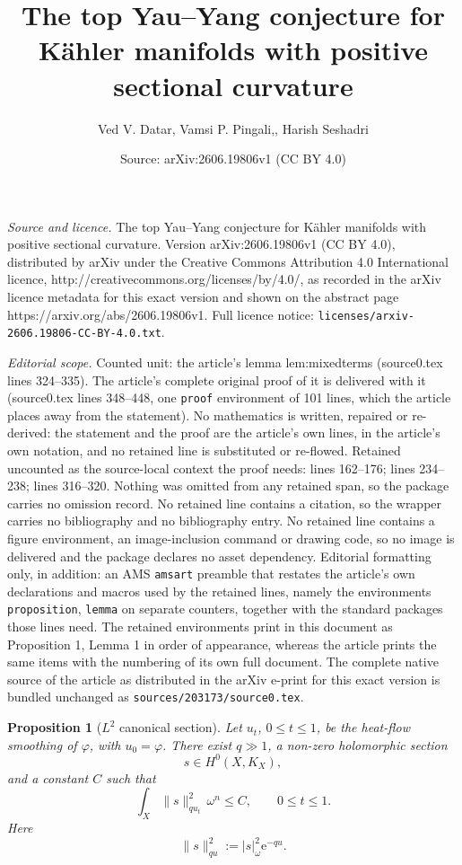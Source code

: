\documentclass[10pt,a4paper]{amsart}
\title{The top Yau--Yang conjecture for K\"ahler manifolds with positive sectional curvature}
\author{Ved V. Datar, Vamsi P. Pingali,, Harish Seshadri}
\date{Source: arXiv:2606.19806v1 (CC BY 4.0)}
\newtheorem{proposition}{Proposition}
\newcommand{\e}{\mathrm e}
\begin{document}
\maketitle

\noindent\emph{Source and licence.} The top Yau--Yang conjecture for K\"ahler manifolds with positive sectional curvature. Version arXiv:2606.19806v1 (CC BY 4.0), distributed by arXiv under the Creative Commons Attribution 4.0 International licence, http://creativecommons.org/licenses/by/4.0/, as recorded in the arXiv licence metadata for this exact version and shown on the abstract page https://arxiv.org/abs/2606.19806v1. Full licence notice: \texttt{licenses/arxiv-2606.19806-CC-BY-4.0.txt}.\par\smallskip

\noindent\textit{Editorial scope.} Counted unit: the article's lemma lem:mixedterms (source0.tex lines 324--335). The article's complete original proof of it is delivered with it (source0.tex lines 348--448, one \texttt{proof} environment of 101 lines, which the article places away from the statement). No mathematics is written, repaired or re-derived: the statement and the proof are the article's own lines, in the article's own notation, and no retained line is substituted or re-flowed.  Retained uncounted as the source-local context the proof needs: lines 162--176; lines 234--238; lines 316--320.  Nothing was omitted from any retained span, so the package carries no omission record.  No retained line contains a citation, so the wrapper carries no bibliography and no bibliography entry.  No retained line contains a figure environment, an image-inclusion command or drawing code, so no image is delivered and the package declares no asset dependency.  Editorial formatting only, in addition: an AMS \texttt{amsart} preamble that restates the article's own declarations and macros used by the retained lines, namely the environments \texttt{proposition}, \texttt{lemma} on separate counters, together with the standard packages those lines need.  The retained environments print in this document as Proposition 1, Lemma 1 in order of appearance, whereas the article prints the same items with the numbering of its own full document.  The complete native source of the article as distributed in the arXiv e-print for this exact version is bundled unchanged as \texttt{sources/203173/source0.tex}.
\begin{proposition}[$L^2$ canonical section]\label{prop:section}
Let $u_t$, $0\le t\le1$, be the heat-flow smoothing of $\varphi$, with $u_0=\varphi$. There exist $q\gg1$, a non-zero holomorphic section
\[
        s\in H^0(X,K_X),
\]
and a constant $C$ such that
\[
        \int_X \|s\|^2_{q u_t}\,\omega^n\le C,
        \qquad 0\le t\le1.
\]
Here
\[
        \|s\|^2_{q u}:=|s|_\omega^2\e^{-q u}.
\]
\end{proposition}
\end{document}
